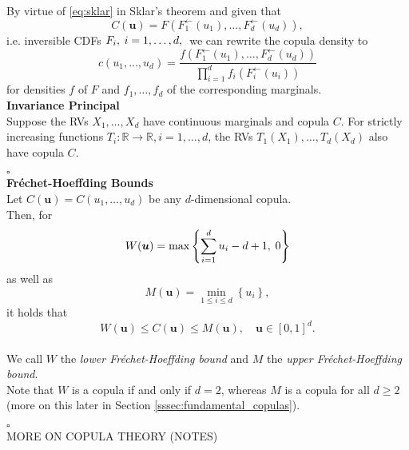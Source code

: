 By virtue of \autoref{eq:sklar} in Sklar's theorem and given that
\begin{equation} 
C(\mathbf{u})=F\left(F_{1}^{\leftarrow}\left(u_{1}\right), \ldots, F_{d}^{\leftarrow}\left(u_{d}\right)\right) ,
\label{eq:sklar_inverse}
\end{equation}
i.e. inversible \ac{CDF}s $ F_i, \hspace{0.25em} i = 1, \ldots, d, \hspace{0.25em}$ we can rewrite the copula density to
\begin{equation}
c\left(u_{1}, \ldots, u_{d}\right)=\frac{f\left(F_{1}^{\leftarrow}\left(u_{1}\right), \ldots, F_{d}^{\leftarrow}\left(u_{d}\right)\right)}{\prod \limits _{i=1}^{d} f_{i}\left(F_{i}^{\leftarrow}\left(u_{i}\right)\right)}
\label{eq:copula_density_2}
\end{equation}
for densities $f$ of $F$ and $f_1, \ldots, f_d$ of the corresponding marginals.\\


\textbf{Invariance Principal}\\
Suppose the \ac{RV}s $ X_1, \ldots, X_d $  have continuous marginals and copula $C$. For strictly increasing functions $T_i : \mathbb{R} \rightarrow \mathbb{R}, i = 1, \ldots, d$, the \ac{RV}s $T_1(X_1), \ldots, T_d(X_d)$ also have copula $C$.

\hfill $\square$ \\


\textbf{Fr\'echet-Hoeffding Bounds}\\
Let $C(\bm{u}) = C(u_1, \ldots, u_d)$ be any $d$-dimensional copula.\\
Then, for
\begin{equation}
W(\boldsymbol{u})=\max \left\{\sum\limits_{i=1}^{d} u_{i}-d+1, \hspace{0.25em} 0\right\}
\label{eq:frechet_hoeffding_lower}
\end{equation}
as well as
\begin{equation}
M(\boldsymbol{u})=\min \limits _{1 \leq i \leq d}\left\{u_{i}\right\},
\label{eq:frechet_hoeffding_upper}
\end{equation}
it holds that
\begin{equation}
W(\bm{u}) \leq C(\bm{u}) \leq M(\bm{u}), \quad \bm{u} \in[0,1]^{d}.
\label{eq:frechet_hoeffding}
\end{equation}\\
We call $W$ the \textit{lower Fr\'echet-Hoeffding bound} and $M$ the \textit{upper Fr\'echet-Hoeffding bound}.\\
Note that $W$ is a copula if and only if $d=2$, whereas $M$ is a copula for all $d \geq 2$ (more on this later in Section \ref{sssec:fundamental_copulas}).

\hfill $\square$ \\


MORE ON COPULA THEORY (NOTES)



